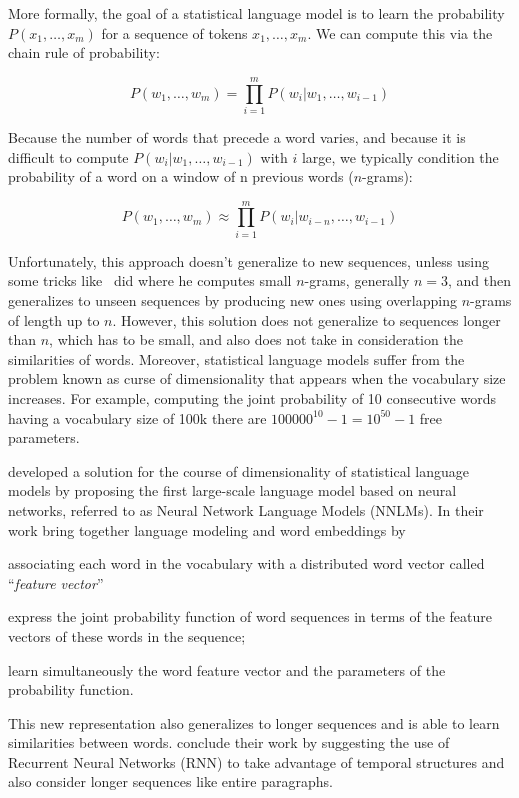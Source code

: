 More formally, the goal of a statistical language model is to learn the probability $P(x_1, \dots, x_m)$ for a sequence of tokens $x_1, \dots, x_m$. We can compute this via the chain rule of probability:

\begin{equation}
P\left(w_{1}, \ldots, w_{m}\right)=\prod_{i=1}^{m} P\left(w_{i} | w_{1}, \dots, w_{i-1}\right)
\end{equation}

Because the number of words that precede a word varies, and because it is difficult to compute $P(w_i | w_1,\dots, w_{i-1})$ with $i$ large, we typically condition the probability of a word on a window of n previous words ($n$-grams): 


\begin{equation}
P\left(w_{1}, \ldots, w_{m}\right) \approx \prod_{i=1}^{m} P\left(w_{i} | w_{i-n}, \dots, w_{i-1}\right)
\end{equation}

Unfortunately, this approach doesn't generalize to new sequences, unless using some tricks like~\citet{katz1987probablm} did where he computes small $n$-grams, generally $n=3$, and then generalizes to unseen sequences by producing new ones using overlapping $n$-grams of length up to $n$. However, this solution does not generalize to sequences longer than $n$, which has to be small, and also does not take in consideration the similarities of words. Moreover, statistical language models suffer from the problem known as curse of dimensionality that appears when the vocabulary size increases. For example, computing the joint probability of 10 consecutive words having a vocabulary size of 100k there are $100000^{10} - 1 = 10^{50} - 1$ free parameters. 

\citet{bengio2000nnlm} developed a solution for the course of dimensionality of statistical language models by proposing the first large-scale language model based on neural networks, referred to as Neural Network Language Models (NNLMs). In their work \citet{bengio2000nnlm} bring together language modeling and word embeddings by \begin {enumerate*} [1) ]
\item associating each word in the vocabulary with a distributed word vector called ``\textit{feature vector}'' \item express the joint probability function of word sequences in terms of the feature vectors of these words in the sequence; \item learn simultaneously the word feature vector and the parameters of the probability function.
\end {enumerate*} This new representation also generalizes to longer sequences and is able to learn similarities between words. \citet{bengio2000nnlm} conclude their work by suggesting the use of Recurrent Neural Networks (RNN) to take advantage of temporal structures and also consider longer sequences like entire paragraphs.

